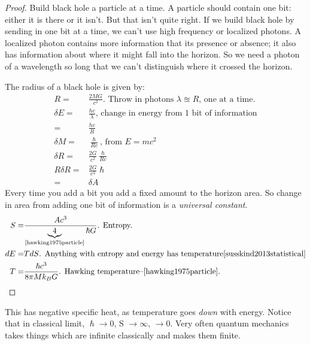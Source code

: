 \documentclass[]{article}
\begin{document}
\begin{proof}
	Build black hole a particle at a time. A particle should contain one bit: either it is there or it isn't. But that isn't quite right. If we build black hole by sending in one bit at a time, we can't use high frequency or localized photons. A localized photon contains more information that its presence or absence; it also has information about where it might fall into the horizon. So we need a photon of a wavelength so long that we can't distinguish where it crossed the horizon.
	
	The radius of a black hole is given by:
	\begin{align*}
	R =& \frac{2 M G}{c^2} \text{. Throw in photons $\lambda\approxeq R$, one at a time.}\\
	\delta E =& \frac{hc}{\lambda} \text{, change in energy from 1 bit of information}\\
	=& \frac{hc}{R}\\
	\delta M =& \frac{\hslash}{Rc} \text{, from $E=mc^2$}\\
	\delta R =& \frac{2G}{c^2}  \frac{\hslash}{Rc}\\
	R \delta R=& \frac{2G}{c^3}  \hslash\\
	=& \delta A
	\end{align*}
	Every time you add a bit you add a fixed amount to the horizon  area. So change in area from adding one bit of information is a \emph{universal constant}.
	\begin{align*}
	S =& \frac{A c^3}{\underbrace{4}_\text{\cite{hawking1975particle}} \hslash G} \text{. Entropy.}\\
	dE =& T dS \text{. Anything with entropy and energy has temperature\cite{susskind2013statistical}}\\
	T =& \frac{\hslash  c^3}{8 \pi M k_B G} \text{. Hawking temperature--\cite{hawking1975particle}.}
	\end{align*}
\end{proof}

This has negative specific heat, as temperature goes \emph{down} with energy. Notice that in classical limit, $\hslash \rightarrow 0$, S $\rightarrow \infty$, $\rightarrow 0$. Very often quantum mechanics takes things which are infinite classically and makes them finite.
\end{document}
